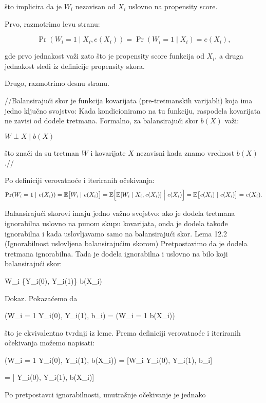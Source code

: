 \documentclass[12pt, a4paper]{article}
\begin{document}
što implicira da je \( W_i \) nezavisan od \( X_i \) uslovno na propensity score.

Prvo, razmotrimo levu stranu:

\[ \Pr(W_i = 1 \mid X_i, e(X_i)) = \Pr(W_i = 1 \mid X_i) = e(X_i), \]

gde prvo jednakost važi zato što je propensity score funkcija od \( X_i \), a druga jednakost sledi iz definicije propensity skora.

Drugo, razmotrimo desnu stranu.


//Balansirajući skor je funkcija kovarijata (pre-tretmanskih varijabli) koja ima jedno ključno svojstvo:
Kada kondicioniramo na tu funkciju, raspodela kovarijata ne zavisi od dodele tretmana.
Formalno, za balansirajući skor \( b(X) \) važi:

\( W \perp X \mid b(X) \)


što znači da su tretman \( W \) i kovarijate \( X \) nezavisni kada znamo vrednost \( b(X) \).//


Po definiciji verovatnoće i iteriranih očekivanja:
\[
\Pr(W_i = 1 \mid \mathit{e}(X_i)) 
= \mathbb{E}\bigl[ W_i \mid \mathit{e}(X_i) \bigr]
= \mathbb{E}\Bigl[ \mathbb{E}[ W_i \mid X_i, \mathit{e}(X_i) ] \;\Big|\; \mathit{e}(X_i) \Bigr]
= \mathbb{E}\bigl[ \mathit{e}(X_i) \mid \mathit{e}(X_i) \bigr]
= \mathit{e}(X_i).
\]


Balansirajući skorovi imaju jedno važno svojstvo: ako je dodela tretmana ignorabilna uslovno na punom skupu kovarijata, onda je dodela takođe ignorabilna i kada uslovljavamo samo na balansirajući skor.
Lema 12.2 (Ignorabilnost uslovljena balansirajućim skorom)
Pretpostavimo da je dodela tretmana ignorabilna. Tada je dodela ignorabilna i uslovno na bilo koji balansirajući skor:

W_i \;\perp\; \{Y_i(0), Y_i(1)\} \;\mid\; b(X_i)


Dokaz. Pokazaćemo da

\Pr(W_i = 1 \mid Y_i(0), Y_i(1), b_i) \;=\; \Pr(W_i = 1 \mid b(X_i))


što je ekvivalentno tvrdnji iz leme. Prema definiciji verovatnoće i iteriranih očekivanja možemo napisati:

\Pr(W_i = 1 \mid Y_i(0), Y_i(1), b(X_i)) 
= [W_i \mid Y_i(0), Y_i(1), b_i]

= \Big[\, \mathbb{E}[W_i \mid Y_i(0), Y_i(1), X_i, b_i] \;\Big|\; Y_i(0), Y_i(1), b(X_i)\Big]


Po pretpostavci ignorabilnosti, unutrašnje očekivanje je jednako
\end{document}
